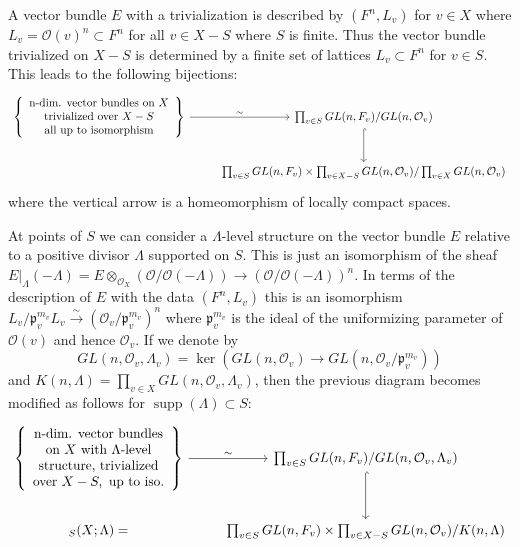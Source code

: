 \documentclass[12pt,a4paper]{article}
\theoremstyle{plain}
\theoremstyle{definition}
\theoremstyle{remark}
\newcommand{\fp}{\mathfrak{p}}
\newcommand{\cO}{\mathcal{O}}
\providecommand{\cO}{\mathcal{O}}
\providecommand{\fp}{\mathfrak{p}}
\providecommand{\supp}{\operatorname{supp}}
\let\Vec\relax
\DeclareMathOperator{\Vec}{Vec}
\begin{document}
A vector bundle $E$ with a trivialization is described by $(F^n, L_v)$ for $v \in X$ where $L_v = \cO(v)^n \subset F^n$ for all $v \in X - S$ where $S$ is finite. Thus the vector bundle trivialized on $X - S$ is determined by a finite set of lattices $L_v \subset F^n$ for $v \in S$. This leads to the following bijections:
\[
\begin{tikzcd}
\left\{\begin{array}{c}
\text{n-dim. vector bundles on } X \\
\text{trivialized over } X-S \\
\text{all up to isomorphism}
\end{array}\right\} \arrow[r, "\sim"] & \prod_{v \in S} GL(n, F_v)/GL(n, \cO_v) \arrow[d, hook] \\
& \prod_{v \in S} GL(n, F_v) \times \prod_{v \in X-S} GL(n, \cO_v)/\prod_{v \in X} GL(n, \cO_v)
\end{tikzcd}
\]
where the vertical arrow is a homeomorphism of locally compact spaces.

At points of $S$ we can consider a $\Lambda$-level structure on the vector bundle $E$ relative to a positive divisor $\Lambda$ supported on $S$. This is just an isomorphism of the sheaf $E|_\Lambda(-\Lambda) = E \otimes_{\cO_X} (\cO/\cO(-\Lambda)) \to (\cO/\cO(-\Lambda))^n$. In terms of the description of $E$ with the data $(F^n, L_v)$ this is an isomorphism $L_v/\fp_v^{m_v} L_v \xrightarrow{\sim} (\cO_v/\fp_v^{m_v})^n$ where $\fp_v^{m_v}$ is the ideal of the uniformizing parameter of $\cO(v)$ and hence $\cO_v$. If we denote by
\[
GL(n, \cO_v, \Lambda_v) = \ker(GL(n, \cO_v) \to GL(n, \cO_v/\fp_v^{m_v}))
\]
and $K(n, \Lambda) = \prod_{v \in X} GL(n, \cO_v, \Lambda_v)$, then the previous diagram becomes modified as follows for $\supp(\Lambda) \subset S$:
\[
\begin{tikzcd}
\left\{\begin{array}{c}
\text{n-dim. vector bundles} \\
\text{on } X \text{ with } \Lambda\text{-level} \\
\text{structure, trivialized} \\
\text{over } X-S, \text{ up to iso.}
\end{array}\right\} \arrow[r, "\sim"] & \prod_{v \in S} GL(n, F_v)/GL(n, \cO_v, \Lambda_v) \arrow[d, hook] \\
\Vec_S(X; \Lambda) = & \prod_{v \in S} GL(n, F_v) \times \prod_{v \in X-S} GL(n, \cO_v)/K(n, \Lambda)
\end{tikzcd}
\]
\end{document}
